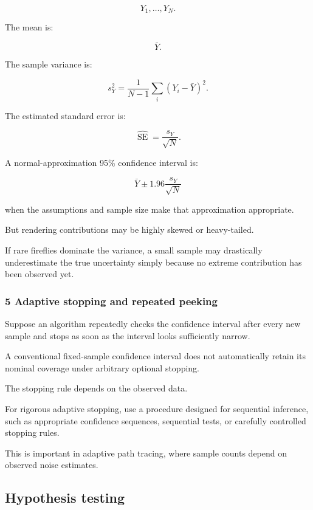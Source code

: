 \[
 Y_1,\ldots,Y_N.
\]

The mean is:

\[
 \bar Y.
\]

The sample variance is:

\[
 s_Y^2= \frac1{N-1}\sum_i(Y_i-\bar Y)^2.
\]

The estimated standard error is:

\[
 \boxed{ \widehat{\operatorname{SE}}= \frac{s_Y}{\sqrt N} }.
\]

A normal-approximation 95\% confidence interval is:

\[
 \boxed{ \bar Y\pm1.96\frac{s_Y}{\sqrt N} }
\]

when the assumptions and sample size make that approximation appropriate.

But rendering contributions may be highly skewed or heavy-tailed.

If rare fireflies dominate the variance, a small sample may drastically underestimate the true uncertainty simply because no extreme contribution has been observed yet.

\subsubsection{5 Adaptive stopping and repeated peeking}\label{02-foundations-ii-ch030-adaptive-stopping-and-repeated-peeking}

\hypertarget{02-foundations-ii-ch030-adaptive-stopping-and-repeated-peeking}{}

Suppose an algorithm repeatedly checks the confidence interval after every new sample and stops as soon as the interval looks sufficiently narrow.

A conventional fixed-sample confidence interval does not automatically retain its nominal coverage under arbitrary optional stopping.

The stopping rule depends on the observed data.

For rigorous adaptive stopping, use a procedure designed for sequential inference, such as appropriate confidence sequences, sequential tests, or carefully controlled stopping rules.

This is important in adaptive path tracing, where sample counts depend on observed noise estimates.

\subsection{Hypothesis testing}\label{02-foundations-ii-ch030-hypothesis-testing}

